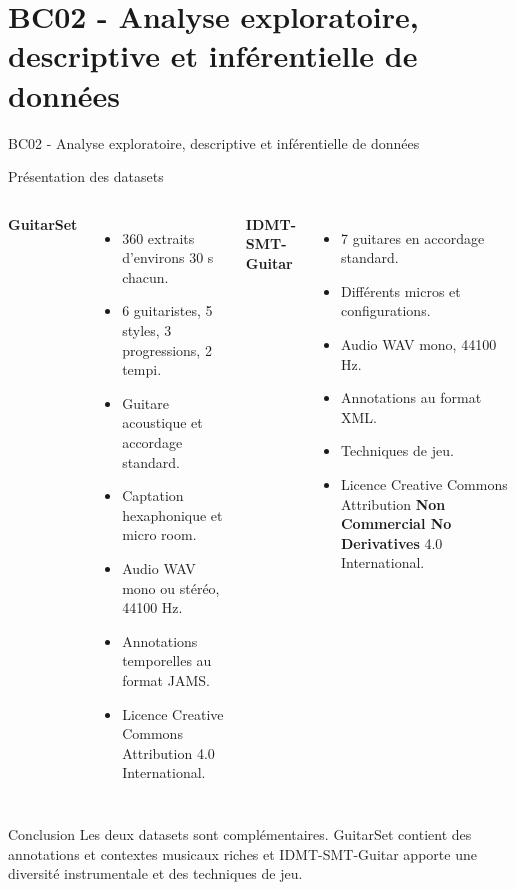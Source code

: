 \section{BC02 - Analyse exploratoire, descriptive et inférentielle de données}

\begin{frame}
    \centering
    \huge
    BC02 - Analyse exploratoire, descriptive et inférentielle de données
\end{frame}


\begin{frame}{Présentation des datasets}
	\small
	\begin{columns}[T]
		
		\textbf{GuitarSet \cite{xi2018guitarset}} \quad \href{https://guitarset.weebly.com/}{}
		\begin{itemize}
			\item 360 extraits d'environs 30 s chacun.
			\item 6 guitaristes, 5 styles, 3 progressions, 2 tempi.
			\item Guitare acoustique et accordage standard.
			\item Captation hexaphonique et micro room.
			\item Audio WAV mono ou stéréo, 44100 Hz.
			\item Annotations temporelles au format JAMS.
			\item Licence Creative Commons Attribution 4.0 International.
		\end{itemize}
		
		
		\textbf{IDMT-SMT-Guitar \cite{kehling2023idmt}} \quad \href{https://www.idmt.fraunhofer.de/en/publications/datasets/guitar.html}{}
		\begin{itemize}
			\item 7 guitares en accordage standard.
			\item Différents micros et configurations.
			\item Audio WAV mono, 44100 Hz.
			\item Annotations au format XML.
			\item Techniques de jeu.
			\item Licence Creative Commons Attribution \textbf{Non Commercial No Derivatives} 4.0 International.
		\end{itemize}
	\end{columns}
	
	\vspace{0.2cm}
	
	\begin{block}{Conclusion}
		Les deux datasets sont complémentaires. GuitarSet contient des annotations et contextes musicaux riches et IDMT-SMT-Guitar apporte une diversité instrumentale et des techniques de jeu.
	\end{block}
\end{frame}


